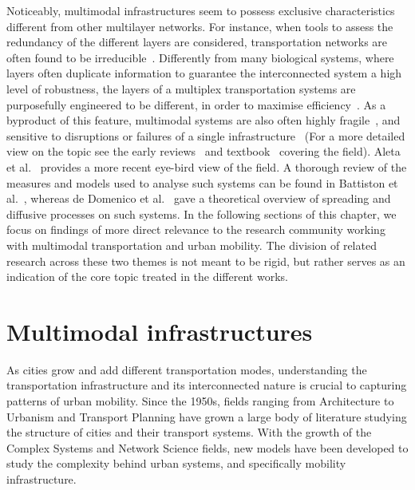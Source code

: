 Noticeably, multimodal infrastructures seem to possess exclusive characteristics different from other multilayer networks. For instance, when tools to assess the redundancy of the different layers are considered, transportation networks are often found to be irreducible~\cite{dedomenico2015structural}. Differently from many biological systems, where layers often duplicate information to guarantee the interconnected system a high level of robustness, the layers of a multiplex transportation systems are purposefully engineered to be different, in order to maximise efficiency~\cite{latora2001efficient}. As a byproduct of this feature, multimodal systems are also often highly fragile~\cite{buldyrev2010catastrophic}, and sensitive to disruptions or failures of a single infrastructure~\cite{dedomenico2014interconnected} (For a more detailed view on the topic see the early reviews~\cite{boccaletti2014structure, kivela2014multilayer} and textbook~\cite{bianconi2018multilayer} covering the field). Aleta et al.~\cite{aleta2019multilayer} provides a more recent eye-bird view of the field. A thorough review of the measures and models used to analyse such systems can be found in Battiston et al.~\cite{battiston2017new}, whereas de Domenico et al.~\cite{dedomenico2016physics} gave a theoretical overview of spreading and diffusive processes on such systems. In the following sections of this chapter, we focus on findings of more direct relevance to the research community working with multimodal transportation and urban mobility. The division of related research across these two themes is not meant to be rigid, but rather serves as an indication of the core topic treated in the different works. 


\section{Multimodal infrastructures}\label{sec:multimodalinfrastructures}

As cities grow and add different transportation modes, understanding the transportation infrastructure and its interconnected nature is crucial to capturing patterns of urban mobility. Since the 1950s, fields ranging from Architecture to Urbanism and Transport Planning have grown a large body of literature studying the structure of cities and their transport systems. With the growth of the Complex Systems and Network Science fields, new models have been developed to study the complexity behind urban systems, and specifically mobility infrastructure.

